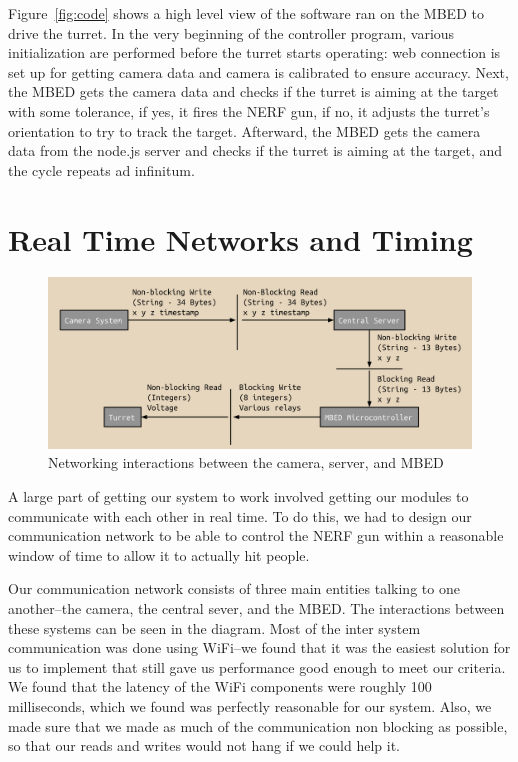 \documentclass[journal]{IEEEtran}
\begin{document}
Figure~\ref{fig:code} shows a high level view of the software ran on the MBED to drive the turret. In the very beginning of the controller program, various initialization are performed before the turret starts operating: web connection is set up for getting camera data and camera is calibrated to ensure accuracy. Next, the MBED gets the camera data and checks if the turret is aiming at the target with some tolerance, if yes, it fires the NERF gun, if no, it adjusts the turret's orientation to try to track the target. Afterward, the MBED gets the camera data from the node.js server and checks if the turret is aiming at the target, and the cycle repeats ad infinitum.

\section{Real Time Networks and Timing}

\begin{figure}[htbp]
    \centering
    \includegraphics[width=0.99\linewidth]{network.png}
    \caption{Networking interactions between the camera, server, and MBED}
    \label{fig:network}
\end{figure}

A large part of getting our system to work involved getting our modules to communicate with each other in real time. To do this, we had to design our communication network to be able to control the NERF gun within a reasonable window of time to allow it to actually hit people.

Our communication network consists of three main entities talking to one another--the camera, the central sever, and the MBED. The interactions between these systems can be seen in the diagram. Most of the inter system communication was done using WiFi--we found that it was the easiest solution for us to implement that still gave us performance good enough to meet our criteria. We found that the latency of the WiFi components were roughly 100 milliseconds, which we found was perfectly reasonable for our system. Also, we made sure that we made as much of the communication non blocking as possible, so that our reads and writes would not hang if we could help it.
\end{document}
